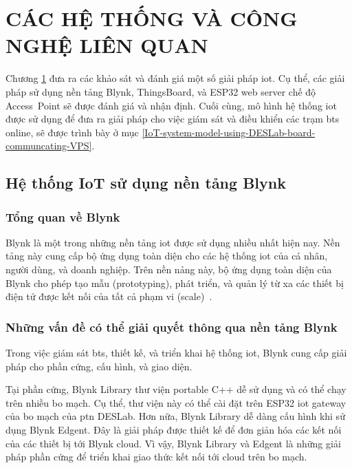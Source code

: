 \chapter{CÁC HỆ THỐNG VÀ CÔNG NGHỆ LIÊN QUAN}
\label{Chapter2}

Chương \ref{Chapter2} đưa ra các khảo sát và đánh giá một số giải pháp \acrshort{iot}. Cụ thể, các giải pháp sử dụng nền tảng Blynk, ThingsBoard, và ESP32 web server chế độ Access~Point sẽ được đánh giá và nhận định. Cuối cùng, mô hình hệ thống \acrshort{iot} được sử dụng để đưa ra giải pháp cho việc giám sát và điều khiển các trạm \acrshort{bts} online, sẽ được trình bày ở mục \ref{IoT-system-model-using-DESLab-board-communcating-VPS}.

\section{Hệ thống IoT sử dụng nền tảng Blynk}

\subsection{Tổng quan về Blynk}

Blynk là một trong những nền tảng \acrshort{iot} được sử dụng nhiều nhất hiện nay. Nền tảng này cung cấp bộ ứng dụng toàn diện cho các hệ thống \acrshort{iot} của cá nhân, người dùng, và doanh nghiệp. Trên nền nảng này, bộ ứng dụng toàn diện của Blynk cho phép tạo mẫu (prototyping), phát triển, và quản lý từ xa các thiết bị điện tử được kết nối của tất cả phạm vi (scale)~\cite{Blynk-Overview}.

\subsection{Những vấn đề có thể giải quyết thông qua nền tảng Blynk}

Trong việc giám sát \acrshort{bts}, thiết kế, và triển khai hệ thống \acrshort{iot}, Blynk cung cấp giải pháp cho phần cứng, cấu hình, và giao diện.

Tại phần cứng, Blynk Library thư viện portable C++ dễ sử dụng và có thể chạy trên nhiều bo mạch. Cụ thể, thư viện này có thể cài đặt trên ESP32 \acrshort{iot} gateway của bo mạch của \acrshort{ptn} DESLab. Hơn nữa, Blynk Library dễ dàng cấu hình khi sử dụng Blynk Edgent. Đây là giải pháp được thiết kế để đơn giản hóa các kết nối của các thiết bị tới Blynk cloud. Vì vậy, Blynk Library và Edgent là những giải pháp phần cứng để triển khai giao thức kết nối tới cloud trên bo mạch.

